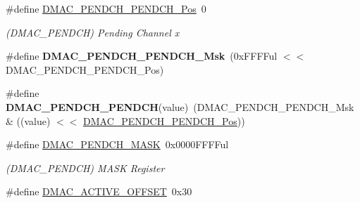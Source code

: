 \begin{DoxyCompactItemize}
\item 
\hypertarget{group___s_a_m_l21___d_m_a_c_ga149b3b56d6ec1a11b668b5380f5a800b}{}\#define \hyperlink{group___s_a_m_l21___d_m_a_c_ga149b3b56d6ec1a11b668b5380f5a800b}{D\+M\+A\+C\+\_\+\+P\+E\+N\+D\+C\+H\+\_\+\+P\+E\+N\+D\+C\+H\+\_\+\+Pos}~0\label{group___s_a_m_l21___d_m_a_c_ga149b3b56d6ec1a11b668b5380f5a800b}

\begin{DoxyCompactList}\small\item\em (D\+M\+A\+C\+\_\+\+P\+E\+N\+D\+C\+H) Pending Channel x \end{DoxyCompactList}\item 
\hypertarget{group___s_a_m_l21___d_m_a_c_ga56da3ad2363c11da646085857cd7a3da}{}\#define {\bfseries D\+M\+A\+C\+\_\+\+P\+E\+N\+D\+C\+H\+\_\+\+P\+E\+N\+D\+C\+H\+\_\+\+Msk}~(0x\+F\+F\+F\+Ful $<$$<$ D\+M\+A\+C\+\_\+\+P\+E\+N\+D\+C\+H\+\_\+\+P\+E\+N\+D\+C\+H\+\_\+\+Pos)\label{group___s_a_m_l21___d_m_a_c_ga56da3ad2363c11da646085857cd7a3da}

\item 
\hypertarget{group___s_a_m_l21___d_m_a_c_gab27c1642abe8d94d8a7a529d49ce72a8}{}\#define {\bfseries D\+M\+A\+C\+\_\+\+P\+E\+N\+D\+C\+H\+\_\+\+P\+E\+N\+D\+C\+H}(value)~(D\+M\+A\+C\+\_\+\+P\+E\+N\+D\+C\+H\+\_\+\+P\+E\+N\+D\+C\+H\+\_\+\+Msk \& ((value) $<$$<$ \hyperlink{group___s_a_m_l21___d_m_a_c_ga149b3b56d6ec1a11b668b5380f5a800b}{D\+M\+A\+C\+\_\+\+P\+E\+N\+D\+C\+H\+\_\+\+P\+E\+N\+D\+C\+H\+\_\+\+Pos}))\label{group___s_a_m_l21___d_m_a_c_gab27c1642abe8d94d8a7a529d49ce72a8}

\item 
\hypertarget{group___s_a_m_l21___d_m_a_c_ga8c3dbf6e225ad223cbc54b60b5fbf5b3}{}\#define \hyperlink{group___s_a_m_l21___d_m_a_c_ga8c3dbf6e225ad223cbc54b60b5fbf5b3}{D\+M\+A\+C\+\_\+\+P\+E\+N\+D\+C\+H\+\_\+\+M\+A\+S\+K}~0x0000\+F\+F\+F\+Ful\label{group___s_a_m_l21___d_m_a_c_ga8c3dbf6e225ad223cbc54b60b5fbf5b3}

\begin{DoxyCompactList}\small\item\em (D\+M\+A\+C\+\_\+\+P\+E\+N\+D\+C\+H) M\+A\+S\+K Register \end{DoxyCompactList}\item 
\hypertarget{group___s_a_m_l21___d_m_a_c_ga5f977e85f651efb68d3fec5fcf2c5877}{}\#define \hyperlink{group___s_a_m_l21___d_m_a_c_ga5f977e85f651efb68d3fec5fcf2c5877}{D\+M\+A\+C\+\_\+\+A\+C\+T\+I\+V\+E\+\_\+\+O\+F\+F\+S\+E\+T}~0x30\label{group___s_a_m_l21___d_m_a_c_ga5f977e85f651efb68d3fec5fcf2c5877}


\end{DoxyCompactItemize}

